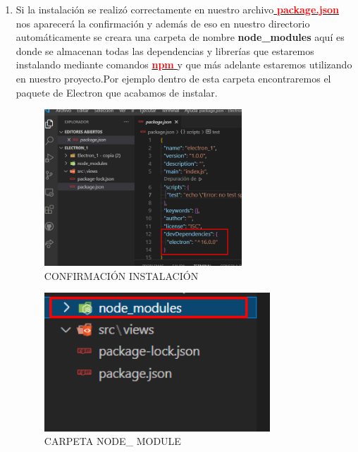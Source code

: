 \begin{enumerate}
    \item Si la instalación se realizó correctamente en nuestro archivo\hyperlink{package}{\textcolor{red}{\textbf{ package.json}}} nos aparecerá la confirmación y además de eso en nuestro directorio automáticamente se creara una carpeta de nombre \textbf{node\_modules} aquí es donde se almacenan todas las dependencias y librerías que estaremos instalando mediante comandos \hyperlink{camannpm}{\textcolor{red}{\textbf{npm }}}y que más adelante estaremos utilizando en nuestro proyecto.Por ejemplo dentro de esta carpeta encontraremos el paquete de Electron que acabamos de instalar.  
  
\begin{figure}[H]
 \centering
\includegraphics[width=0.7\textwidth]{img/electron9.png}
\caption{CONFIRMACIÓN INSTALACIÓN}
\end{figure}
\begin{figure}[H]
\centering
\includegraphics[width=0.8\textwidth]{img/electron10.png}   
\caption{CARPETA NODE\_ MODULE}
\end{figure}
\begin{figure}[H]
\centering

\end{figure}
\end{enumerate}
